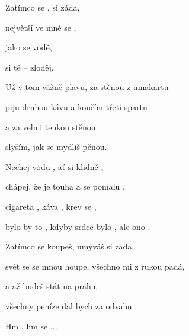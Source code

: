 

\zs
Zatímco se ,  si záda,

 největší  ve mně se ,

 jako se  vodě,

 si tě  -- zloděj.
\ks

\zs
Už v tom vážně plavu, za stěnou z umakartu

piju druhou kávu a kouřím třetí spartu

a za velmi tenkou stěnou

slyším, jak se mydlíš pěnou.
\ks

\zr
Nechej vodu ,  ať si klidně ,

chápej, že  je touha a  se pomalu ,

cigareta , káva , krev se ,

bylo by to , kdyby srdce bylo , ale ono .
\kr

\zs
Zatímco se koupeš, umýváš si záda,

svět se se mnou houpe, všechno mi z rukou padá,

a až budeš stát na prahu,

všechny peníze dal bych za odvahu.
\ks

\zr
Hm  , hm  se ...
\kr

\kp





